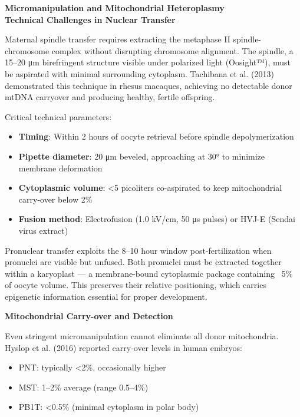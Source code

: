 \begin{technical}
{\Large\textbf{Micromanipulation and Mitochondrial Heteroplasmy}}\\[0.7em]

\noindent\textbf{Technical Challenges in Nuclear Transfer}

Maternal spindle transfer requires extracting the metaphase II spindle-chromosome complex without disrupting chromosome alignment. The spindle, a 15–20 μm birefringent structure visible under polarized light (Oosight™), must be aspirated with minimal surrounding cytoplasm. Tachibana et al. (2013) demonstrated this technique in rhesus macaques, achieving no detectable donor mtDNA carryover and producing healthy, fertile offspring.

Critical technical parameters:
\begin{itemize}[leftmargin=*]
\item \textbf{Timing}: Within 2 hours of oocyte retrieval before spindle depolymerization
\item \textbf{Pipette diameter}: 20 μm beveled, approaching at 30° to minimize membrane deformation
\item \textbf{Cytoplasmic volume}: <5 picoliters co-aspirated to keep mitochondrial carry-over below 2\%
\item \textbf{Fusion method}: Electrofusion (1.0 kV/cm, 50 μs pulses) or HVJ-E (Sendai virus extract)
\end{itemize}

Pronuclear transfer exploits the 8–10 hour window post-fertilization when pronuclei are visible but unfused. Both pronuclei must be extracted together within a karyoplast — a membrane-bound cytoplasmic package containing ~5\% of oocyte volume. This preserves their relative positioning, which carries epigenetic information essential for proper development.

\noindent\textbf{Mitochondrial Carry-over and Detection}

Even stringent micromanipulation cannot eliminate all donor mitochondria. Hyslop et al. (2016) reported carry-over levels in human embryos:
\begin{itemize}[leftmargin=*]
\item PNT: typically <2\%, occasionally higher
\item MST: 1–2\% average (range 0.5–4\%)
\item PB1T: <0.5\% (minimal cytoplasm in polar body)
\end{itemize}


\end{technical}

